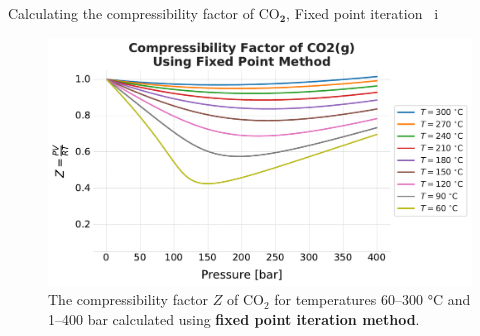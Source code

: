 \begin{frame}{Calculating the compressibility factor of CO$_{\boldsymbol{2}}$, Fixed point iteration \, i}

\begin{figure}
\begin{centering}
\includegraphics[height=0.8\textheight]{figures/activity-models/co2-compressibility-factor-fixed-point}
\par\end{centering}
\caption*{The compressibility factor $Z$ of CO$_{2}$ for temperatures
60–300 °C and 1–400 bar calculated using \textbf{fixed point iteration method}. }
\end{figure}

\end{frame}
%
%
